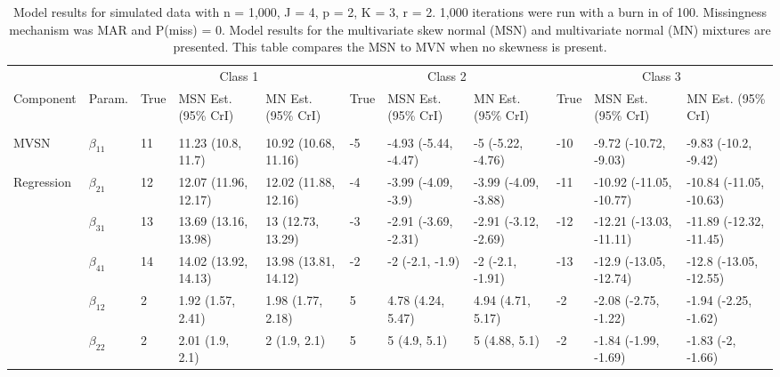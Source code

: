 \documentclass{article}
\begin{document}
\begin{landscape}\begin{table}[t]

\caption{\label{tab:unnamed-chunk-5}Model results for simulated data with n = 1,000, J = 4, p = 2, K = 3, r = 2. 1,000 iterations were run with a burn in of 100. Missingness mechanism was MAR and P(miss) = 0. Model results for the multivariate skew normal (MSN) and multivariate normal (MN) mixtures are presented. This table compares the MSN to MVN when no skewness is present.}
\centering
\fontsize{6}{8}\selectfont
\begin{tabular}{lllllllllll}
\toprule
\multicolumn{2}{c}{ } & \multicolumn{3}{c}{Class 1} & \multicolumn{3}{c}{Class 2} & \multicolumn{3}{c}{Class 3} \\
\cmidrule(l{3pt}r{3pt}){3-5} \cmidrule(l{3pt}r{3pt}){6-8} \cmidrule(l{3pt}r{3pt}){9-11}
Component & Param. & True & MSN Est. (95\% CrI) & MN Est. (95\% CrI)  & True & MSN Est. (95\% CrI) & MN Est. (95\% CrI) & True & MSN Est. (95\% CrI) & MN Est. (95\% CrI)\\
\midrule
\addlinespace[0.3em]
\multicolumn{11}{l}{\textbf{ }}\\
\hspace{1em}MVSN & $\beta_{11}$ & 11 & 11.23 (10.8, 11.7) & 10.92 (10.68, 11.16) & -5 & -4.93 (-5.44, -4.47) & -5 (-5.22, -4.76) & -10 & -9.72 (-10.72, -9.03) & -9.83 (-10.2, -9.42)\\
\hspace{1em}Regression & $\beta_{21}$ & 12 & 12.07 (11.96, 12.17) & 12.02 (11.88, 12.16) & -4 & -3.99 (-4.09, -3.9) & -3.99 (-4.09, -3.88) & -11 & -10.92 (-11.05, -10.77) & -10.84 (-11.05, -10.63)\\
\hspace{1em} & $\beta_{31}$ & 13 & 13.69 (13.16, 13.98) & 13 (12.73, 13.29) & -3 & -2.91 (-3.69, -2.31) & -2.91 (-3.12, -2.69) & -12 & -12.21 (-13.03, -11.11) & -11.89 (-12.32, -11.45)\\
\hspace{1em} & $\beta_{41}$ & 14 & 14.02 (13.92, 14.13) & 13.98 (13.81, 14.12) & -2 & -2 (-2.1, -1.9) & -2 (-2.1, -1.91) & -13 & -12.9 (-13.05, -12.74) & -12.8 (-13.05, -12.55)\\
\hspace{1em} & $\beta_{12}$ & 2 & 1.92 (1.57, 2.41) & 1.98 (1.77, 2.18) & 5 & 4.78 (4.24, 5.47) & 4.94 (4.71, 5.17) & -2 & -2.08 (-2.75, -1.22) & -1.94 (-2.25, -1.62)\\
\hspace{1em} & $\beta_{22}$ & 2 & 2.01 (1.9, 2.1) & 2 (1.9, 2.1) & 5 & 5 (4.9, 5.1) & 5 (4.88, 5.1) & -2 & -1.84 (-1.99, -1.69) & -1.83 (-2, -1.66)\\

\end{tabular}
\end{table}
\end{landscape}
\end{document}
